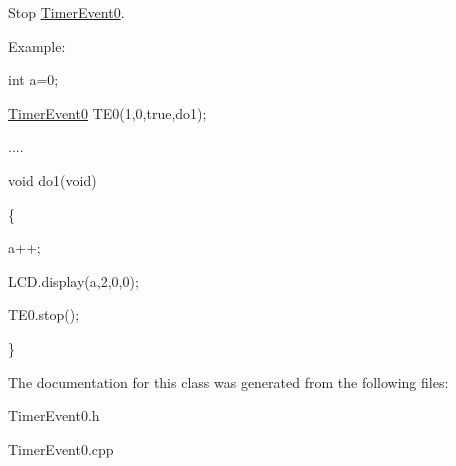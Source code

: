 \label{class_timer_event0_affbfc896cf7971809eb3f24254ecec1d}
\par
Stop \hyperlink{class_timer_event0}{TimerEvent0}.\par
 \par
Example:\par
\par
 int a=0; \par
 \hyperlink{class_timer_event0}{TimerEvent0} TE0(1,0,true,do1);\par
 .... \par
 void do1(void)\par
 \{ \par
 a++; \par
 LCD.display(a,2,0,0);\par
 TE0.stop(); \par
 \}\par
 

The documentation for this class was generated from the following files:\begin{DoxyCompactItemize}
\item 
TimerEvent0.h\item 
TimerEvent0.cpp\end{DoxyCompactItemize}

